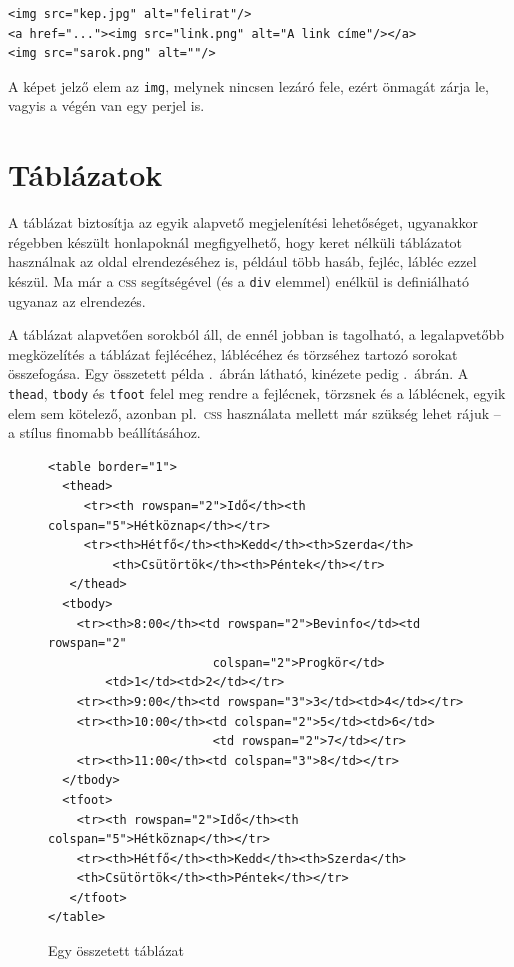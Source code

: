 \begin{Verbatim}[frame=single]
<img src="kep.jpg" alt="felirat"/>
<a href="..."><img src="link.png" alt="A link címe"/></a>
<img src="sarok.png" alt=""/>
\end{Verbatim}

A képet jelző elem az \texttt{img}, melynek nincsen lezáró fele, ezért önmagát
zárja le, vagyis a végén van egy perjel is.



\section{Táblázatok}
A táblázat biztosítja az egyik alapvető megjelenítési lehetőséget, ugyanakkor
régebben készült honlapoknál megfigyelhető, hogy keret nélküli táblázatot
használnak az oldal elrendezéséhez is, például több hasáb, fejléc, lábléc ezzel
készül. Ma már a \textsc{css} segítségével (és a \texttt{div} elemmel) enélkül
is definiálható ugyanaz az elrendezés.

A táblázat alapvetően sorokból áll, de ennél jobban is tagolható, a
legalapvetőbb megközelítés a táblázat fejlécéhez, láblécéhez és törzséhez
tartozó sorokat összefogása. Egy összetett példa .\ ábrán
látható, kinézete pedig .\ ábrán. A \texttt{thead},
\texttt{tbody} és \texttt{tfoot} felel meg rendre a fejlécnek, törzsnek és a
láblécnek, egyik elem sem kötelező, azonban pl.\ \textsc{css} használata mellett
már szükség lehet rájuk -- a stílus finomabb beállításához.

\begin{figure}[tbh]
\begin{Verbatim}[frame=single]
<table border="1">
  <thead>
     <tr><th rowspan="2">Idő</th><th colspan="5">Hétköznap</th></tr>
     <tr><th>Hétfő</th><th>Kedd</th><th>Szerda</th>
         <th>Csütörtök</th><th>Péntek</th></tr>
   </thead>
  <tbody>
    <tr><th>8:00</th><td rowspan="2">Bevinfo</td><td rowspan="2"
                       colspan="2">Progkör</td>
        <td>1</td><td>2</td></tr>
    <tr><th>9:00</th><td rowspan="3">3</td><td>4</td></tr>
    <tr><th>10:00</th><td colspan="2">5</td><td>6</td>
                       <td rowspan="2">7</td></tr>
    <tr><th>11:00</th><td colspan="3">8</td></tr>
  </tbody>
  <tfoot>
    <tr><th rowspan="2">Idő</th><th colspan="5">Hétköznap</th></tr>
    <tr><th>Hétfő</th><th>Kedd</th><th>Szerda</th>
    <th>Csütörtök</th><th>Péntek</th></tr>
   </tfoot>
</table>
\end{Verbatim}
  \caption{Egy összetett táblázat}%
  \label{fig:html-table}%
\end{figure}

